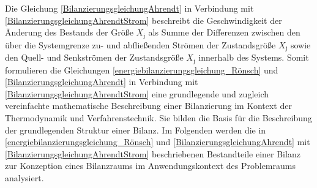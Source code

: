 Die Gleichung \eqref{BilanzierungsgleichungAhrendt} in Verbindung mit \eqref{BilanzierungsgleichungAhrendtStrom} beschreibt die Geschwindigkeit 
der Änderung des Bestands der Größe \(X_{\text{j}}\) als Summe der Differenzen zwischen den über die Systemgrenze zu- und abfließenden Strömen der 
Zustandsgröße \(X_{\text{j}}\) sowie den Quell- und Senkströmen der Zustandsgröße \(X_{\text{j}}\) innerhalb des Systems.  
Somit formulieren die Gleichungen \eqref{energiebilanzierungsgleichung_Rönsch} und \eqref{BilanzierungsgleichungAhrendt} in Verbindung mit 
\eqref{BilanzierungsgleichungAhrendtStrom} eine grundlegende und zugleich vereinfachte mathematische Beschreibung einer Bilanzierung im Kontext 
der Thermodynamik und Verfahrenstechnik. Sie bilden die Basis für die Beschreibung der grundlegenden Struktur einer Bilanz.
Im Folgenden werden die in \eqref{energiebilanzierungsgleichung_Rönsch} und \eqref{BilanzierungsgleichungAhrendt} mit \eqref{BilanzierungsgleichungAhrendtStrom} 
beschriebenen Bestandteile einer Bilanz zur Konzeption eines Bilanzraums im Anwendungskontext des Problemraums analysiert. 